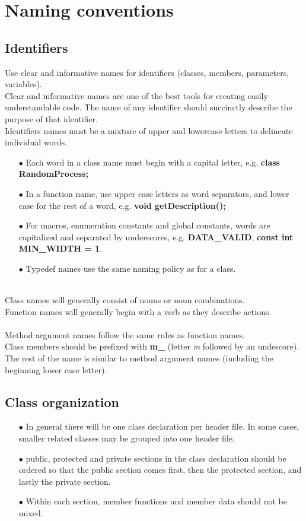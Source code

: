 \section{Naming conventions}

\subsection{Identifiers}
Use clear and informative names for identifiers (classes, members,
parameters, variables).\\
Clear and informative names are one of the best tools for creating
easily understandable code. The name of any identifier should
succinctly describe the purpose of that identifier.\\

Identifiers names must be a mixture of upper and lowercase letters to
delineate individual words.
\begin{itemize}
\item[$\bullet$] Each word in a class name must begin with a capital
  letter, e.g. {\bf class RandomProcess;}
\item[$\bullet$] In a function name, use upper case letters as word
  separators, and lower case for the rest of a word, e.g. {\bf void getDescription();}
\item[$\bullet$] For macros, enumeration constants and global
  constants, words are capitalized and separated by underscores,
  e.g. {\bf DATA\_VALID}, {\bf const int MIN\_WIDTH = 1}.
\item[$\bullet$] Typedef names use the same naming policy as
  for a class.
\end{itemize}
\ \\
Class names will generally consist of nouns or noun combinations.\\
Function names will generally begin with a verb as they describe actions.\\
\ \\
Method argument names follow the same rules as function names.\\
Class members should be prefixed with {\bf m\_} (letter {\it m}
followed by an undescore). The rest of the name is similar to method
argument names (including the beginning lower case letter).

\subsection{Class organization}
\begin{itemize}
\item[$\bullet$] In general there will be one class declaration per
  header file. In some cases, smaller related classes may be grouped
  into one header file.
\item[$\bullet$] public, protected and private sections in the class
  declaration should be ordered so that the public section comes
  first, then the protected section, and lastly the private section.
\item[$\bullet$] Within each section, member functions and member data
  should not be mixed.
\end{itemize}


